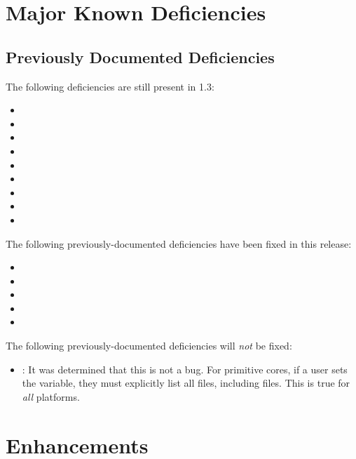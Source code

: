 \section{Major Known Deficiencies}
\label{sec:13_bugs}

\subsection{Previously Documented Deficiencies}
The following deficiencies are still present in 1.3:
\begin{itemize}
\setlength\itemsep{0em} %
\item {}
\item {}
\item {}
\item {}
\item {}
\item {}
\item {}
\item {}
\item {}
\end{itemize}

The following previously-documented deficiencies have been fixed in this release:
\begin{itemize}
\setlength\itemsep{0em} %
\item {}
\item {}
\item {}
\item {}
\item {}
\end{itemize}

The following previously-documented deficiencies will \textit{not} be fixed:
\begin{itemize}
\setlength\itemsep{0em} %
\item {}: It was determined that this is not a bug. For primitive cores, if a user sets the  variable, they must explicitly list all files, including  files. This is true for \textit{all} platforms.
\end{itemize}


\newpage
{}
\section{Enhancements}
